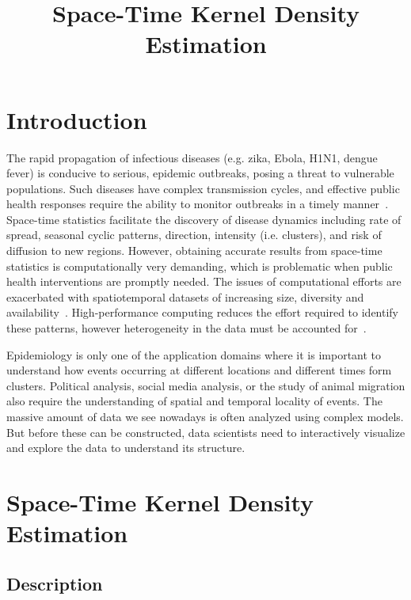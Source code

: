 \documentclass[10pt, conference, compsocconf]{IEEEtran}
\begin{document}
\title{Space-Time Kernel Density Estimation}


\maketitle

\section{Introduction}

The rapid propagation of infectious diseases (e.g. zika, Ebola, H1N1,
dengue fever) is conducive to serious, epidemic outbreaks, posing a
threat to vulnerable populations. Such diseases have complex
transmission cycles, and effective public health responses require the
ability to monitor outbreaks in a timely
manner~\cite{eisen2011using}. Space-time statistics facilitate the
discovery of disease dynamics including rate of spread, seasonal
cyclic patterns, direction, intensity (i.e. clusters), and risk of
diffusion to new regions.  However, obtaining accurate results from
space-time statistics is computationally very demanding, which is
problematic when public health interventions are promptly needed. The
issues of computational efforts are exacerbated with spatiotemporal
datasets of increasing size, diversity and
availability~\cite{grubesic2014spatial}. High-performance computing
reduces the effort required to identify these patterns, however
heterogeneity in the data must be accounted for~\cite{Hohl16}. 


Epidemiology is only one of the application domains where it is
important to understand how events occurring at different locations and
different times form clusters. Political analysis, social media
analysis, or the study of animal migration also require the
understanding of spatial and temporal locality of events. The massive
amount of data we see nowadays is often analyzed using complex
models. But before these can be constructed, data scientists  need to
interactively visualize and explore the data to understand its
structure. 


\section{Space-Time Kernel Density Estimation}
\label{sec:stkde}

\subsection{Description}
\end{document}
